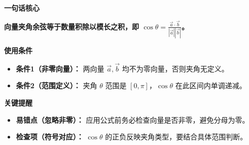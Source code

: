 \begin{summarybox}
	\textbf{\textcolor{CSummary}{一句话核心}}

	\textbf{向量夹角余弦等于数量积除以模长之积，即 $\cos\theta = \frac{\vec{a}\cdot\vec{b}}{|\vec{a}||\vec{b}|}$。}

	\medskip
	\textbf{\textcolor{CSummary}{使用条件}}
	\begin{itemize}[leftmargin=*, itemsep=0.5em, topsep=0.4em]
		\item \textbf{条件1（非零向量）：} 两向量 $\vec{a},\vec{b}$ 均不为零向量，否则夹角无定义。
		\item \textbf{条件2（范围定义）：} 夹角 $\theta$ 范围是 $[0,\pi]$，$\cos\theta$ 在此区间内单调递减。
	\end{itemize}

	\medskip
	\textbf{\textcolor{CSummary}{关键提醒}}
	\begin{itemize}[leftmargin=*, itemsep=0.5em, topsep=0.4em]
		\item \textbf{易错点（忽略非零）：} 应用公式前务必检查向量是否非零，避免分母为零。
		\item \textbf{检查项（符号对应）：} $\cos\theta$ 的正负反映夹角类型，要结合具体范围判断。
	\end{itemize}
\end{summarybox}
